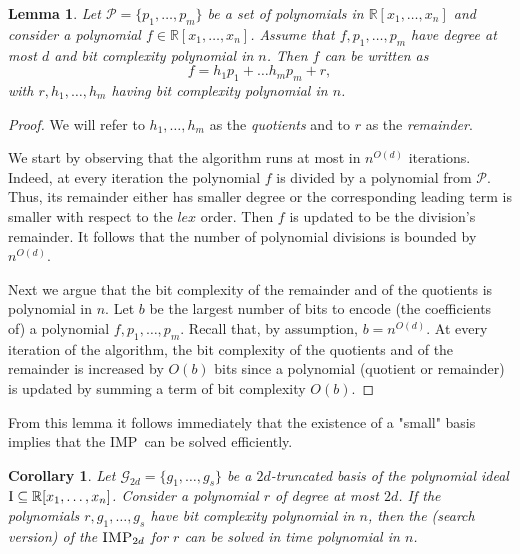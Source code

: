 \documentclass[11pt]{article}
\newcommand{\IMP}{\textsc{IMP}}
\newcommand{\I}{\emph{$\rm{I}$}}
\newcommand{\1}{\textbf{1}}
\newcommand{\GB}{\text{Gr\"{o}bner} }
\newtheorem{lemma}[theorem]{Lemma}
\newtheorem{corollary}[theorem]{Corollary}
\begin{document}
\begin{lemma}\label{th:complexity_polynomial_division}
    Let $\mathcal{P} = \{p_1, \dots, p_m\}$ be a set of polynomials in $\mathbb{R}[x_1, \dots, x_n]$ and consider a polynomial $f \in \mathbb{R}[x_1, \dots, x_n]$. Assume that $f, p_1, \dots, p_m$ have degree at most $d$ and bit complexity polynomial in $n$. Then $f$ can be written as
    \begin{equation*}
        f = h_1 p_1 + \dots h_m p_m + r,
    \end{equation*}
    with $r, h_1, \dots, h_m$ having bit complexity polynomial in $n$.
\end{lemma}

\begin{proof}
    We will refer to $h_1, \dots, h_m$ as the \emph{quotients} and to $r$ as the \emph{remainder}.
    
    We start by observing that the algorithm runs at most in $n^{O(d)}$ iterations. Indeed, at every iteration the polynomial $f$ is divided by a polynomial from $\mathcal{P}$. Thus, its remainder either has smaller degree or the corresponding leading term is smaller with respect to the $lex$ order. Then $f$ is updated to be the division's remainder. It follows that the number of polynomial divisions is bounded by $n^{O(d)}$.

    Next we argue that the bit complexity of the remainder and of the quotients is polynomial in $n$. Let $b$ be the largest number of bits to encode (the coefficients of) a polynomial $f, p_1, \dots, p_m$. Recall that, by assumption, $b = n^{O(d)}$. At every iteration of the algorithm, the bit complexity of the quotients and of the remainder is increased by $O(b)$ bits since a polynomial (quotient or remainder) is updated by summing a term of bit complexity $O(b)$.
\end{proof}

From this lemma it follows immediately that the existence of a "small" \GB basis implies that the \IMP\ can be solved efficiently.

\begin{corollary}
    Let $\mathcal{G}_{2d} = \{g_1, \dots, g_s\}$ be a $2d$-truncated \GB basis of the polynomial ideal $\I \subseteq \mathbb{R}[x_1, \dots, x_n]$. Consider a polynomial $r$ of degree at most $2d$. If the polynomials $r,g_1, \dots, g_s$ have bit complexity polynomial in $n$, then the (search version) of the $\IMP_{2d}$ for $r$ can be solved in time polynomial in $n$.
\end{corollary}
\end{document}
